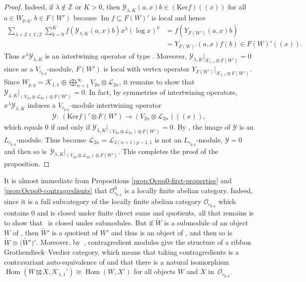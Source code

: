 \documentclass[pdftex]{sigma}
\numberwithin{equation}{section}
\theoremstyle{definition}
\begin{document}
\begin{proof}
Indeed, if $\lambda\notin\mathbb{Z}$ or $K>0$, then $\mathcal{Y}_{\lambda,K}(a,x)b\in(\mathrm{Ker} f)((x))$ for all $a\in W_{p,q}$, $b \in F(W')$ because $\operatorname{Im} f\subseteq F(W)'$ is local and hence
\begin{align*}
\sum_{\lambda+\mathbb{Z}\in\mathbb{C}/\mathbb{Z}}\sum_{k=0}^K f(\mathcal{Y}_{\lambda,K}(a,x)b) x^\lambda(\log x)^k & =f(Y_{F(W')}(a,x)b)\\
&=Y_{F(W)'}(a,x)f(b)\in F(W)'((x)).
\end{align*}
Thus $x^\lambda\mathcal{Y}_{\lambda,K}$ is an intertwining operator of type . Moreover, $\mathcal{Y}_{\lambda,K}\vert_{\mathcal{K}_{1,1}\otimes F(W')}=0$ since as a $V_{c_{p,q}}$-module, $F(W')$ is local with vertex operator $Y_{F(W')}\vert_{\mathcal{K}_{1,1}\otimes F(W')}$. Since $W_{p,q}=\mathcal{K}_{1,1}\oplus \bigoplus_{n=1}^\infty V_{2n}\otimes\mathcal{L}_{2n}$, it remains to show that $\mathcal{Y}_{\lambda,K}\vert_{(V_{2n}\otimes\mathcal{L}_{2n})\otimes F(W')}=0$. In fact, by symmetries of intertwining operators, $x^\lambda\mathcal{Y}_{\lambda,K}$ induces a $V_{c_{p,q}}$-module intertwining operator
\begin{gather*}
\mathcal{Y}\colon\ (\mathrm{Ker} f)'\otimes F(W')\longrightarrow(V_{2n}\otimes\mathcal{L}_{2n})((x)),
\end{gather*}
which equals $0$ if and only if $\mathcal{Y}_{\lambda,K}\vert_{(V_{2n}\otimes\mathcal{L}_{2n})\otimes F(W')}=0$. By \cite[Lemma 5.11]{MS-cpq-Vir}, the image of $\mathcal{Y}$ is an $L_{c_{p,q}}$-module. Thus because $\mathcal{L}_{2n}=\mathcal{L}_{2(n+1)p-1,1}$ is not an $L_{c_{p,q}}$-module, $\mathcal{Y}=0$ and then so is~${\mathcal{Y}_{\lambda,K}\vert_{(V_{2n}\otimes\mathcal{L}_{2n})\otimes F(W')}}$. This completes the proof of the proposition.
\end{proof}


It is almost immediate from Propositions \ref{prop:Ocpq0-first-properties} and \ref{prop:Ocpq0-contragredients} that $\mathcal{O}_{c_{p,q}}^0$ is a locally finite abelian category. Indeed, since it is a full subcategory of the locally finite abelian category $\mathcal{O}_{c_{p,q}}$ which contains $0$ and is closed under finite direct sums and quotients, all that remains is to show that~ is closed under submodules. But if $\widetilde{W}$ is a submodule of an object $W$ of , then $\widetilde{W}'$ is a quotient of $W'$ and thus is an object of , and then so is $\widetilde{W}\cong\bigl(\widetilde{W}'\bigr)'$. Moreover, by~\cite{ALSW}, contragredient modules give  the structure of a ribbon Grothendieck--Verdier category, which means that taking contragredients is a contravariant auto-equivalence of  and that there is a natural isomorphism
$\operatorname{Hom}(W\boxtimes X,\mathcal{K}_{1,1}')\cong\operatorname{Hom}(W,X')$
for all objects $W$ and $X$ in~$\mathcal{O}_{c_{p,q}}$.
\end{document}
